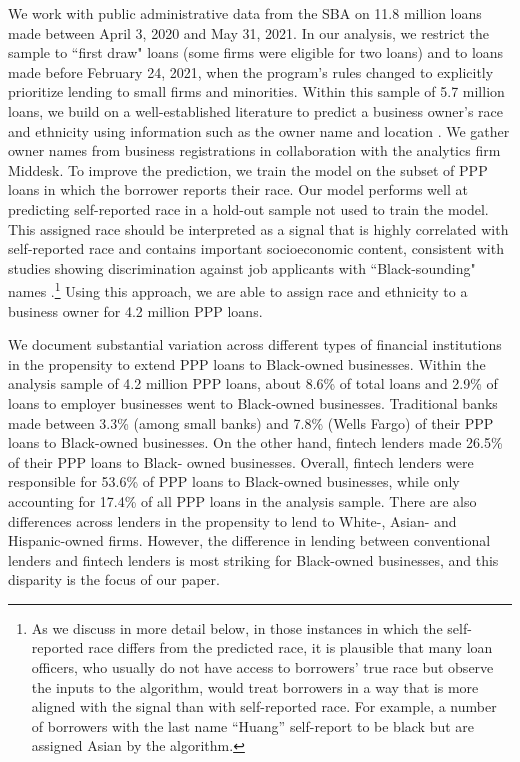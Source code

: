 \documentclass[11pt]{article}
\begin{document}
We work with public administrative data from the SBA on 11.8 million loans made between April 3, 2020 and May 31, 2021. In our analysis, we restrict the sample to ``first draw" loans (some firms were eligible for two loans) and to loans made before February 24, 2021, when the program's rules changed to explicitly prioritize lending to small firms and minorities. Within this sample of 5.7 million loans, we build on a well-established literature to  predict a business owner's race and ethnicity using information such as the owner name and location \citep{Imai2016, Humphries2019, tzioumis2018demographic}. We gather owner names from business registrations in collaboration with the analytics firm Middesk. To improve the prediction, we train the model on the subset of PPP loans in which the borrower reports their race. Our model performs well at predicting self-reported race in a hold-out sample not used to train the model. This assigned race should be interpreted as a signal that is highly correlated with self-reported race and contains important socioeconomic content, consistent with studies showing discrimination against job applicants with ``Black-sounding" names \citep{bertrand2004emily,milkman2012temporal,bartovs2016attention}.\footnote{As we discuss in more detail below, in those instances in which the self-reported race differs from the predicted race, it is plausible that many loan officers, who usually do not have access to borrowers' true race but observe the inputs to the algorithm, would treat borrowers in a way that is more aligned with the signal than with self-reported race. For example, a number of borrowers with the last name ``Huang'' self-report to be black but are assigned Asian by the algorithm.}  Using this approach, we are able to assign race and ethnicity to a business owner for  4.2 million PPP loans. 

We document substantial variation across different types of financial institutions in the propensity to extend PPP loans to Black-owned businesses. Within the analysis sample of 4.2 million PPP loans, about 8.6\% of total loans and 2.9\% of loans to employer businesses went to Black-owned businesses. Traditional banks made between 3.3\% (among small banks) and 7.8\% (Wells Fargo) of their PPP loans to Black-owned businesses. On the other hand, fintech lenders made 26.5\% of their PPP loans to Black- owned businesses. Overall, fintech lenders were responsible for 53.6\% of PPP loans to Black-owned businesses, while only accounting for 17.4\% of all PPP loans in the analysis sample. There are also differences across lenders in the propensity to lend to White-, Asian- and Hispanic-owned firms. However, the difference in lending between conventional lenders and fintech lenders is most striking for Black-owned businesses, and this disparity is the focus of our paper. 
\end{document}
